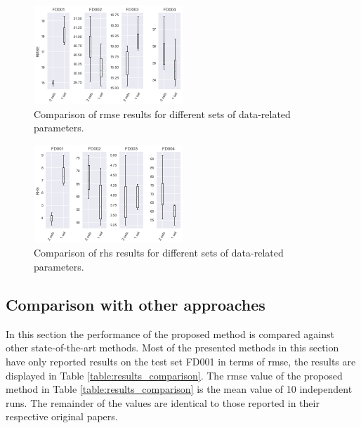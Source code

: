 \begin{figure}[!htb]
\centering
\includegraphics[width=0.5\textwidth]{img/rmse_comparisson.png}
\caption{Comparison of \gls{rmse} results for different sets of data-related parameters.}
\label{fig:scores_rmse}
\end{figure}

\begin{figure}[!htb]
\centering
\includegraphics[width=0.5\textwidth]{img/rhs_comparisson.png}
\caption{Comparison of \gls{rhs} results for different sets of data-related parameters.}
\label{fig:scores_rhs}
\end{figure}

\subsection{Comparison with other approaches}

In this section the performance of the proposed method is compared against other state-of-the-art methods. Most of the presented methods in this section have only reported results on the test set FD001 in terms of \gls{rmse}, the results are displayed in Table \ref{table:results_comparison}. The \gls{rmse} value of the proposed method in Table \ref{table:results_comparison} is the mean value of 10 independent runs. The remainder of the values are identical to those reported in their respective original papers.

